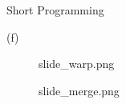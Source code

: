 \documentclass[a4paper,12pt]{article}
\begin{document}
\begin{section}{Short Programming}
\begin{subsection}{(f)}
      \begin{figure}[!htb]
        \caption{slide\_warp.png}
      \end{figure}
      
          \begin{figure}[!htb]
        \caption{slide\_merge.png}
      \end{figure}

\end{subsection}

\end{section}
\end{document}
